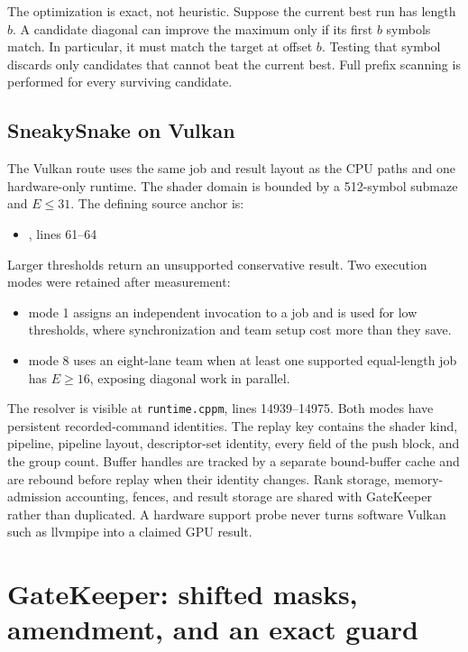 The optimization is exact, not heuristic.  Suppose the current best run has
length \(b\).  A candidate diagonal can improve the maximum only if its first
\(b\) symbols match.  In particular, it must match the target at offset \(b\).
Testing that symbol discards only candidates that cannot beat the current
best.  Full prefix scanning is performed for every surviving candidate.

\subsection{SneakySnake on Vulkan}

The Vulkan route uses the same job and result layout as the CPU paths and one
hardware-only runtime.  The shader domain is bounded by a 512-symbol submaze
and \(E\le31\).  The defining source anchor is:

\begin{itemize}
    \item {}, lines 61--64
\end{itemize}

Larger thresholds return an unsupported conservative result.  Two execution
modes were retained after measurement:

\begin{itemize}
    \item mode 1 assigns an independent invocation to a job and is used for
    low thresholds, where synchronization and team setup cost more than they
    save.
    \item mode 8 uses an eight-lane team when at least one supported
    equal-length job has \(E\ge16\), exposing diagonal work in parallel.
\end{itemize}

The resolver is visible at \texttt{runtime.cppm}, lines 14939--14975.  Both
modes have persistent recorded-command identities.  The replay key contains
the shader kind, pipeline, pipeline layout, descriptor-set identity, every
field of the push block, and the group count.  Buffer handles are tracked by a
separate bound-buffer cache and are rebound before replay when their identity
changes.  Rank storage, memory-admission accounting, fences, and result storage
are shared with GateKeeper rather than duplicated.  A hardware support probe
never turns software Vulkan such as llvmpipe into a claimed GPU result.

\section{GateKeeper: shifted masks, amendment, and an exact guard}
\label{sec:prefilter-gatekeeper}

